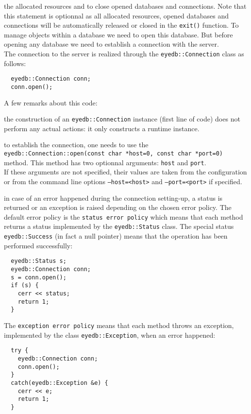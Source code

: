 the \eyedb allocated resources and to close opened databases and connections.
Note that this statement is optionnal as all \eyedb allocated resources,
opened databases and connections will be automatically released or closed
in the \texttt{exit()} function.
\ee
{}
To manage objects within a database we need to open this database.
But before opening any database we need to establish a connection with
the \eyedb server.
\\
The connection to the \eyedb server is realized through the
\texttt{eyedb::Connection} class as follows:
\verbsize
\begin{verbatim}
  eyedb::Connection conn;
  conn.open();
\end{verbatim}
\normalsize
A few remarks about this code:
\be
\item the construction of an \texttt{eyedb::Connection} instance (first line of code)
does not perform any actual actions: it only constructs a runtime instance.
\item to establish the connection, one needs to use the
\texttt{eyedb::Connection::open(const char *host=0, const char *port=0)} method.
This method has two optionnal arguments: \texttt{host} and \texttt{port}.
\\
If these arguments are not specified, their values are taken from the
configuration or
from the command line options \texttt{--host=<host>} and
\texttt{--port=<port>} if specified.
\item in case of an error happened during the connection setting-up,
a status is returned or an exception is raised depending on the
chosen error policy. The default error policy is the \texttt{status error
policy} which means that each \eyedb method returns a status
implemented by the \texttt{eyedb::Status} class. The special status
\texttt{eyedb::Success} (in fact a null pointer) means that the operation
has been performed successfully:
\bi
\item
\verbsize
\begin{verbatim}
  eyedb::Status s;
  eyedb::Connection conn;
  s = conn.open();
  if (s) {
    cerr << status;
    return 1;
  }
\end{verbatim}
\normalsize
\ei
The \texttt{exception error policy} means that each \eyedb method throws
an exception, implemented by the class \texttt{eyedb::Exception}, when an error
happened:
\bi
\item
\verbsize
\begin{verbatim}
  try {
    eyedb::Connection conn;
    conn.open();
  }
  catch(eyedb::Exception &e) {
    cerr << e;
    return 1;
  }
\end{verbatim}
